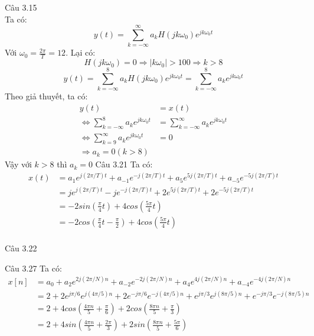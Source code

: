 \documentclass[11pt]{exam}
\begin{document}
\begin{questions}
\question Câu 3.15 \\
    Ta có:
    \begin{equation*}
        y(t) = \sum_{k = -\infty}^{\infty}{a_kH(jk\omega_0)e^{jk\omega_0t}}
    \end{equation*}
    Với $\omega_0 = \frac{2\pi}{T} = 12$. Lại có:
    \begin{equation*}
        H(jk\omega_0) = 0 \Rightarrow |k\omega_0| > 100 \Rightarrow k>8
    \end{equation*}
    \begin{equation*}
        y(t) = \sum_{k = -\infty}^{8}{a_kH(jk\omega_0)e^{jk\omega_0t}} =\sum_{k = -\infty}^{8}{a_ke^{jk\omega_0t}}
    \end{equation*}
    Theo giả thuyết, ta có:
    \begin{equation*}
        \begin{aligned}
        y(t) &= x(t) \\
        \Leftrightarrow \sum_{k = -\infty}^{8}{a_ke^{jk\omega_0t}} &=\sum_{k = -\infty}^{\infty}{a_ke^{jk\omega_0t}} \\
        \Leftrightarrow \sum_{k = 9}^{\infty}{a_ke^{jk\omega_0t}} &= 0 \\
        \Rightarrow a_k = 0 (k > 8)
        \end{aligned}
    \end{equation*}
    Vậy với $k > 8$ thì $a_k = 0$
\question Câu 3.21
    Ta có:
    \begin{equation*}
        \begin{aligned}
            x(t) &= a_1e^{j(2\pi/T)t} + a_{-1}e^{-j(2\pi/T)t} + a_5e^{5j(2\pi/T)t} + a_{-5}e^{-5j(2\pi/T)t} \\
            &= je^{j(2\pi/T)t} - je^{-j(2\pi/T)t} + 2e^{5j(2\pi/T)t} + 2e^{-5j(2\pi/T)t} \\
            &= -2sin(\frac{\pi}{4}t) + 4cos(\frac{5\pi}{4}t) \\ 
            &= -2cos(\frac{\pi}{4}t - \frac{\pi}{2}) + 4cos(\frac{5\pi}{4}t) \\ 
        \end{aligned}
    \end{equation*}

\question Câu 3.22

\question Câu 3.27
    Ta có:
    \begin{equation*}
        \begin{aligned}
            x[n] &= a_0 + a_2e^{2j(2\pi/N)n} + a_{-2}e^{-2j(2\pi/N)n} + a_4e^{4j(2\pi/N)n} + a_{-4}e^{-4j(2\pi/N)n} \\
            &= 2 + 2e^{j\pi/6}e^{j(4\pi/5)n} + 2e^{-j\pi/6}e^{-j(4\pi/5)n} + e^{j\pi/3}e^{j(8\pi/5)n} + e^{-j\pi/3}e^{-j(8\pi/5)n} \\
            &= 2 + 4cos(\frac{4\pi n}{5}+ \frac{\pi}{6}) + 2cos(\frac{8\pi n}{5}+\frac{\pi}{3}) \\
            &= 2 + 4sin(\frac{4\pi n}{5}+ \frac{2\pi}{3}) + 2sin(\frac{8\pi n}{5}+\frac{5\pi}{6}) \\
        \end{aligned}
    \end{equation*}

\end{questions}
\end{document}
